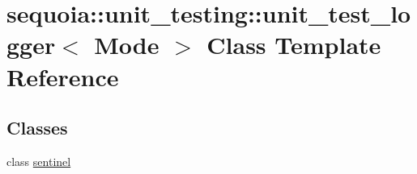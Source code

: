 \hypertarget{classsequoia_1_1unit__testing_1_1unit__test__logger}{}\section{sequoia\+::unit\+\_\+testing\+::unit\+\_\+test\+\_\+logger$<$ Mode $>$ Class Template Reference}
\label{classsequoia_1_1unit__testing_1_1unit__test__logger}
\subsection*{Classes}
\begin{DoxyCompactItemize}
\item 
class \mbox{\hyperlink{classsequoia_1_1unit__testing_1_1unit__test__logger_1_1sentinel}{sentinel}}
\end{DoxyCompactItemize}

